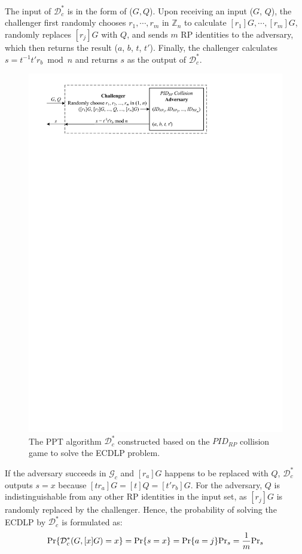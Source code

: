 The input of $\mathcal{D}^*_c$ is in the form of ($G, Q$). Upon receiving an input ($G$, $Q$), the challenger first randomly chooses $r_1, \cdots, r_m$ in $\mathbb{Z}_n$ to calculate $[r_1]G, \cdots, [r_m]G$, randomly replaces $[r_j]G$ with $Q$, and sends $m$ RP identities to the adversary, which then returns the result ($a$, $b$, $t$, $t'$). Finally, the challenger calculates $s = t^{-1}t'r_b \bmod n$ and returns $s$ as the output of $\mathcal{D}^*_c$.

\begin{figure}[tb]
  \centering
  \includegraphics[width=0.97\linewidth]{fig/ecdlp_algorithm.pdf}
  \caption{The PPT algorithm $\mathcal{D}^*_c$ constructed based on the $PID_{RP}$ collision game to solve the ECDLP problem.}
  \label{fig:ecdlp_algorithm}
\end{figure}

If the adversary succeeds in $\mathcal{G}_c$ and $[r_a]G$ happens to be replaced with $Q$,
 $\mathcal{D}^*_c$ outputs $s=x$ because $[tr_a]G = [t]Q = [t'r_b]G$. For the adversary, $Q$ is indistinguishable from any other RP identities in the input set, as $[r_j]G$ is randomly replaced by the challenger.
Hence, the probability of solving the ECDLP by $\mathcal{D}^*_c$ is formulated as:
\begin{equation*}
{\rm Pr}\{\mathcal{D}^*_c(G, [x]G)=x\} = {\rm Pr}\{s = x\}={\rm Pr}\{a=j\}{\rm Pr}_s=\frac{1}{m}{\rm Pr}_s
\end{equation*}

